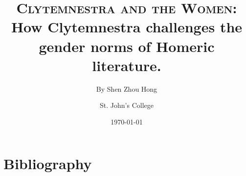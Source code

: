 \documentclass[12pt, letter, final, onecolumn, notitlepage]{article}
\title{
    \textbf{\textsc{Clytemnestra and the Women}}:
    \\ How Clytemnestra challenges the gender norms of Homeric literature.
}
\author{By Shen Zhou Hong \and St. John's College}
\date{\today}
\begin{document}
\maketitle



\clearpage
\nocite{*}
\section{Bibliography}
\printbibliography[heading=none]

\end{document}
